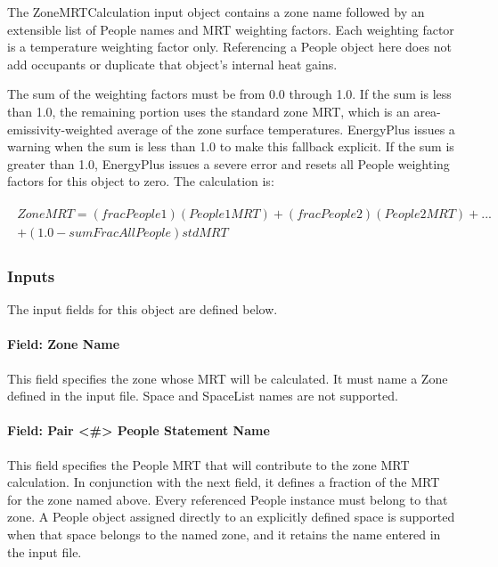 The ZoneMRTCalculation input object contains a zone name followed by an extensible list of People names and MRT weighting factors. Each weighting factor is a temperature weighting factor only. Referencing a People object here does not add occupants or duplicate that object's internal heat gains.

The sum of the weighting factors must be from 0.0 through 1.0. If the sum is less than 1.0, the remaining portion uses the standard zone MRT, which is an area-emissivity-weighted average of the zone surface temperatures. EnergyPlus issues a warning when the sum is less than 1.0 to make this fallback explicit. If the sum is greater than 1.0, EnergyPlus issues a severe error and resets all People weighting factors for this object to zero. The calculation is:

\begin{align}
\begin{split}
ZoneMRT = (fracPeople1)(People1MRT) + (fracPeople2)(People2MRT) + ... \\
        + (1.0-sumFracAllPeople)stdMRT
\end{split}
\end{align}

\subsubsection{Inputs}\label{inputs-zonemrtcalculation}

The input fields for this object are defined below.

\paragraph{Field: Zone Name}\label{field-zonemrtcalculation-zonename}

This field specifies the zone whose MRT will be calculated. It must name a Zone defined in the input file. Space and SpaceList names are not supported.

\paragraph{Field: Pair \textless{}\#\textgreater{} People Statement Name}\label{field-zonemrtcalculation-peoplenameX}

This field specifies the People MRT that will contribute to the zone MRT calculation. In conjunction with the next field, it defines a fraction of the MRT for the zone named above. Every referenced People instance must belong to that zone. A People object assigned directly to an explicitly defined space is supported when that space belongs to the named zone, and it retains the name entered in the input file.

